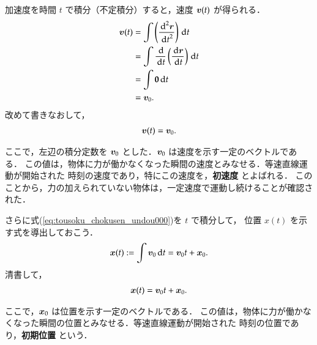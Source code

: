             加速度を時間 $t$ で積分（不定積分）すると，速度 $\boldsymbol{v}(t)$ が得られる．
                \begin{align*}
                    \boldsymbol{v}(t) &= \int \left( \frac{{\,\mathrm{d}}^{2} \boldsymbol{r}}{{\,\mathrm{d} t}^{2}} \right) \,\mathrm{d} t  \\
                           &= \int \frac{\,\mathrm{d}}{\,\mathrm{d} t}\left( \frac{\,\mathrm{d} \boldsymbol{r}}{\,\mathrm{d} t}  \right) \,\mathrm{d} t  \\
                           &= \int \textbf{0} \,\mathrm{d} t  \\
                           &= {\boldsymbol{v}_{0}}.
                \end{align*}
                        改めて書きなおして，
                \begin{align}\label{eq:tousoku_chokusen_undou000}
                    \bv(t) = {\bv_{0}}.
                \end{align}

            ここで，左辺の積分定数を $\boldsymbol{v}_{0}$ とした．$\boldsymbol{v}_{0}$ は速度を示す一定のベクトルである．
            この値は，物体に力が働かなくなった瞬間の速度とみなせる．等速直線運動が開始された
            時刻の速度であり，特にこの速度を，\textbf{初速度} とよばれる．
            このことから，力の加えられていない物体は，一定速度で運動し続けることが確認された．

            さらに式(\ref{eq:tousoku_chokusen_undou000})を $t$ で積分して，
            位置 $x(t)$ を示す式を導出しておこう．
                \begin{equation*}
                   \boldsymbol{x}(t) := \int {\boldsymbol{v}_{0}} \,\mathrm{d} t =  {\boldsymbol{v}_{0}} t +  {\boldsymbol{x}_{0}}.
                \end{equation*}
            清書して，
                \begin{align}
                   \boldsymbol{x}(t) =  {\boldsymbol{v}_{0}} t +  {\boldsymbol{x}_{0}}.
                \end{align}

            ここで，$\boldsymbol{x}_{0}$ は位置を示す一定のベクトルである．
            この値は，物体に力が働かなくなった瞬間の位置とみなせる．等速直線運動が開始された
            時刻の位置であり，\textbf{初期位置} という．


